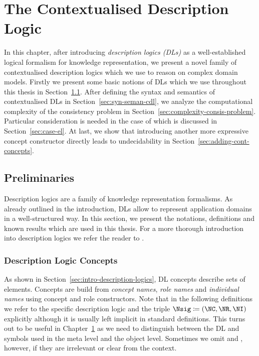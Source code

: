 \chapter{The Contextualised Description Logic \texorpdfstring{\LMLO}{LM[LO]}}
\label{cha:context-dls}

\LMLO
In this chapter, after introducing \emph{description logics (DLs)} as a well-established logical
formalism for knowledge representation, we present a novel family of contextualised description
logics which we use to reason on complex domain models. Firstly we present some basic notions of DLs
which we use throughout this thesis in Section~\ref{sec:preliminaries}.
%
After defining the syntax and semantics of contextualised DLs in Section~\ref{sec:syn-seman-cdl}, we
analyze the computational complexity of the consistency problem in
Section~\ref{sec:complexity-consis-problem}. Particular consideration is needed in the case of \EL
which is discussed in Section~\ref{sec:case-el}. At last, we show that introducing another more
expressive concept constructor directly leads to undecidability in
Section~\ref{sec:adding-cont-concepts}.

\section{Preliminaries}
\label{sec:preliminaries}

Description logics are a family of knowledge representation formalisms. As already outlined in the
introduction, DLs allow to represent application domains in a well-structured way. In this section,
we present the notations, definitions and known results which are used in this thesis.
%
For a more thorough introduction into description logics we refer the reader to
\cite{DLhandbook-07}.

\subsection{Description Logic Concepts}
\label{sec:dl-concepts}

As shown in Section~\ref{sec:intro-description-logics}, DL concepts describe sets of
elements. Concepts are build from \emph{concept names}, \emph{role names} and \emph{individual
  names} using concept and role constructors.  Note that in the following definitions we refer to
the specific description logic \Lmc and the triple $\Nsig \coloneqq (\NC, \NR, \NI)$ explicitly
although it is usually left implicit in standard definitions.  This turns out to be useful in
Chapter~\ref{cha:context-dls} as we need to distinguish between the DL and symbols used in the meta
level and the object level.  Sometimes we omit \Lmc and \Nsig, however, if they are irrelevant or
clear from the context.

